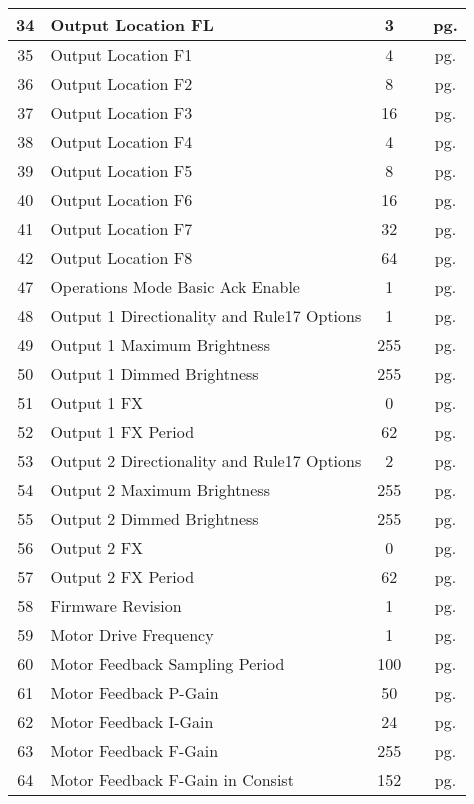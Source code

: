 \documentclass[12pt,letterpaper,draft]{memoir} %
\begin{document}
\begin{center}
\begin{longtable}{|c|l|c|c|c|}
34&Output Location FL&3&&pg. \pageref{CV34} \\ \hline
35&Output Location F1&4&&pg. \pageref{CV35} \\ \hline
36&Output Location F2&8&&pg. \pageref{CV36} \\ \hline
37&Output Location F3&16&&pg. \pageref{CV37} \\ \hline
38&Output Location F4&4&&pg. \pageref{CV38} \\ \hline
39&Output Location F5&8&&pg. \pageref{CV39} \\ \hline
40&Output Location F6&16&&pg. \pageref{CV40} \\ \hline
41&Output Location F7&32&&pg. \pageref{CV41} \\ \hline
42&Output Location F8&64&&pg. \pageref{CV42} \\ \hline
47&Operations Mode Basic Ack Enable&1&&pg. \pageref{CV47} \\ \hline
48&Output 1 Directionality and Rule17 Options&1&&pg. \pageref{CV48} \\ \hline
49&Output 1 Maximum Brightness&255&&pg. \pageref{CV49} \\ \hline
50&Output 1 Dimmed Brightness&255&&pg. \pageref{CV50} \\ \hline
51&Output 1 FX&0&&pg. \pageref{CV51} \\ \hline
52&Output 1 FX Period&62&&pg. \pageref{CV52} \\ \hline
53&Output 2 Directionality and Rule17 Options&2&&pg. \pageref{CV53} \\ \hline
54&Output 2 Maximum Brightness&255&&pg. \pageref{CV54} \\ \hline
55&Output 2 Dimmed Brightness&255&&pg. \pageref{CV55} \\ \hline
56&Output 2 FX&0&&pg. \pageref{CV56} \\ \hline
57&Output 2 FX Period&62&&pg. \pageref{CV57} \\ \hline
58&Firmware Revision&1&&pg. \pageref{CV58} \\ \hline
59&Motor Drive Frequency&1&&pg. \pageref{CV59} \\ \hline
60&Motor Feedback Sampling Period&100&&pg. \pageref{CV60} \\ \hline
61&Motor Feedback P-Gain&50&&pg. \pageref{CV61} \\ \hline
62&Motor Feedback I-Gain&24&&pg. \pageref{CV62} \\ \hline
63&Motor Feedback F-Gain&255&&pg. \pageref{CV63} \\ \hline
64&Motor Feedback F-Gain in Consist&152&&pg. \pageref{CV64} \\ \hline

\end{longtable}
\end{center}
\end{document}
